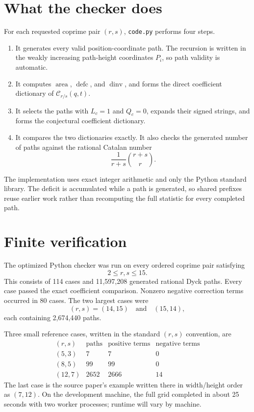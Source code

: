 \documentclass{article}
\newcommand{\area}{\operatorname{area}}
\newcommand{\dinv}{\operatorname{dinv}}
\newcommand{\defc}{\operatorname{defc}}
\newcommand{\Cat}{\mathcal C}
\begin{document}
\section{What the checker does}

For each requested coprime pair \((r,s)\), \texttt{code.py} performs four
steps.

\begin{enumerate}
\item It generates every valid position-coordinate path.  The recursion is
      written in the weakly increasing path-height coordinates \(P_i\), so
      path validity is automatic.
\item It computes \(\area\), \(\defc\), and \(\dinv\), and forms the direct
      coefficient dictionary of \(\Cat_{r/s}(q,t)\).
\item It selects the paths with \(L_c=1\) and \(Q_c=0\), expands their signed
      strings, and forms the conjectural coefficient dictionary.
\item It compares the two dictionaries exactly.  It also checks the generated
      number of paths against the rational Catalan number
      \[
        \frac{1}{r+s}\binom{r+s}{r}.
      \]
\end{enumerate}

The implementation uses exact integer arithmetic and only the Python standard
library.  The deficit is accumulated while a path is generated, so shared
prefixes reuse earlier work rather than recomputing the full statistic for
every completed path.

\section{Finite verification}

The optimized Python checker was run on every ordered coprime pair satisfying
\[
  2\le r,s\le15.
\]
This consists of 114 cases and 11,597,208 generated rational Dyck paths.  Every
case passed the exact coefficient comparison.  Nonzero negative correction
terms occurred in 80 cases.  The two largest cases were
\[
  (r,s)=(14,15)\quad\text{and}\quad(15,14),
\]
each containing 2,674,440 paths.

Three small reference cases, written in the standard \((r,s)\) convention,
are
\[
\begin{array}{c|r|r|r}
(r,s)&\text{paths}&\text{positive terms}&\text{negative terms}\\
\hline
(5,3)&7&7&0\\
(8,5)&99&99&0\\
(12,7)&2652&2666&14
\end{array}
\]
The last case is the source paper's example written there in width/height
order as \((7,12)\).  On the development machine, the full grid completed in
about 25 seconds with two worker processes; runtime will vary by machine.
\end{document}
